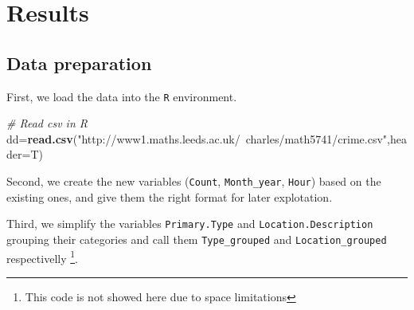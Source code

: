\documentclass[]{article}
\newenvironment{Shaded}{\begin{snugshade}}{\end{snugshade}}
\newcommand{\KeywordTok}[1]{\textcolor[rgb]{0.13,0.29,0.53}{\textbf{{#1}}}}
\newcommand{\DataTypeTok}[1]{\textcolor[rgb]{0.13,0.29,0.53}{{#1}}}
\newcommand{\DecValTok}[1]{\textcolor[rgb]{0.00,0.00,0.81}{{#1}}}
\newcommand{\StringTok}[1]{\textcolor[rgb]{0.31,0.60,0.02}{{#1}}}
\newcommand{\CommentTok}[1]{\textcolor[rgb]{0.56,0.35,0.01}{\textit{{#1}}}}
\newcommand{\NormalTok}[1]{{#1}}
\let\rmarkdownfootnote\footnote%
\def\footnote{\protect\rmarkdownfootnote}
\begin{document}
\section{Results}\label{results}

\subsection{Data preparation}\label{data-preparation}

First, we load the data into the \texttt{R} environment.

\begin{Shaded}
\begin{Highlighting}[]
\CommentTok{# Read csv in R}
\NormalTok{dd=}\KeywordTok{read.csv}\NormalTok{(}\StringTok{"http://www1.maths.leeds.ac.uk/~charles/math5741/crime.csv"}\NormalTok{,}\DataTypeTok{header=}\NormalTok{T)}
\end{Highlighting}
\end{Shaded}

Second, we create the new variables (\texttt{Count},
\texttt{Month\_year}, \texttt{Hour}) based on the existing ones, and
give them the right format for later explotation.

\begin{Shaded}
\end{Shaded}

Third, we simplify the variables \texttt{Primary.Type} and
\texttt{Location.Description} grouping their categories and call them
\texttt{Type\_grouped} and \texttt{Location\_grouped} respectivelly
\footnote{This code is not showed here due to space limitations}.
\end{document}
